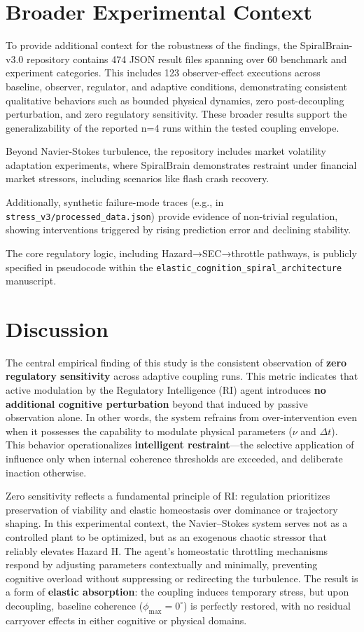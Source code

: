 \documentclass[12pt,a4paper]{article}
\begin{document}
\section{Broader Experimental Context}

To provide additional context for the robustness of the findings, the SpiralBrain-v3.0 repository contains 474 JSON result files spanning over 60 benchmark and experiment categories. This includes 123 observer-effect executions across baseline, observer, regulator, and adaptive conditions, demonstrating consistent qualitative behaviors such as bounded physical dynamics, zero post-decoupling perturbation, and zero regulatory sensitivity. These broader results support the generalizability of the reported n=4 runs within the tested coupling envelope.

Beyond Navier-Stokes turbulence, the repository includes market volatility adaptation experiments, where SpiralBrain demonstrates restraint under financial market stressors, including scenarios like flash crash recovery.

Additionally, synthetic failure-mode traces (e.g., in \texttt{stress\_v3/processed\_data.json}) provide evidence of non-trivial regulation, showing interventions triggered by rising prediction error and declining stability.

The core regulatory logic, including Hazard→SEC→throttle pathways, is publicly specified in pseudocode within the \texttt{elastic\_cognition\_spiral\_architecture} manuscript.

\section{Discussion}

The central empirical finding of this study is the consistent observation of \textbf{zero regulatory sensitivity} across adaptive coupling runs. This metric indicates that active modulation by the Regulatory Intelligence (RI) agent introduces \textbf{no additional cognitive perturbation} beyond that induced by passive observation alone. In other words, the system refrains from over-intervention even when it possesses the capability to modulate physical parameters ($\nu$ and $\Delta t$). This behavior operationalizes \textbf{intelligent restraint}—the selective application of influence only when internal coherence thresholds are exceeded, and deliberate inaction otherwise.

Zero sensitivity reflects a fundamental principle of RI: regulation prioritizes preservation of viability and elastic homeostasis over dominance or trajectory shaping. In this experimental context, the Navier--Stokes system serves not as a controlled plant to be optimized, but as an exogenous chaotic stressor that reliably elevates Hazard H. The agent's homeostatic throttling mechanisms respond by adjusting parameters contextually and minimally, preventing cognitive overload without suppressing or redirecting the turbulence. The result is a form of \textbf{elastic absorption}: the coupling induces temporary stress, but upon decoupling, baseline coherence ($\phi_{\max} = 0^\circ$) is perfectly restored, with no residual carryover effects in either cognitive or physical domains.
\end{document}
